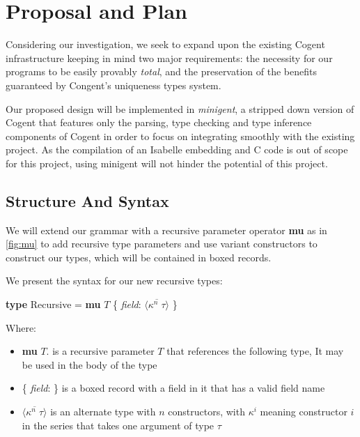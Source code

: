\chapter{Proposal and Plan}\label{ch:style}

Considering our investigation, we seek to expand upon the existing Cogent infrastructure keeping in mind
two major requirements: the necessity for our programs to be easily provably \textit{total},
and the preservation of the benefits guaranteed by Congent's uniqueness types system.

Our proposed design will be implemented in \textit{minigent}, a stripped down version of Cogent that
features only the parsing, type checking and type inference components of Cogent in order to
focus on integrating smoothly with the existing project. As the compilation of an Isabelle embedding
and C code is out of scope for this project, using minigent will not hinder the potential of this
project.

\section{Structure And Syntax}

We will extend our grammar with a recursive parameter operator \textbf{mu} as in \autoref{fig:mu} to add 
recursive type parameters and use variant constructors to construct our types,
which will be contained in boxed records.

We present the syntax for our new recursive types:

\begin{center}
    \textbf{type} Recursive = \textbf{mu} $T$ \{ \textit{field}: $\langle \overline{\kappa^n\; \tau} \rangle$ \}
\end{center}

Where:
\begin{itemize}
   \item
        \textbf{mu} $T$. is a recursive parameter $T$ that references the following type,
        It may be used in the body of the type
    \item
        \{ \textit{field}: \} is a boxed record with a field in it that has a valid field name
    \item 
        $\langle \overline{\kappa^n\; \tau} \rangle$ is an alternate type with $n$ constructors, 
        with $\kappa^i$ meaning constructor $i$ in the series that takes one argument of type $\tau$
\end{itemize}

